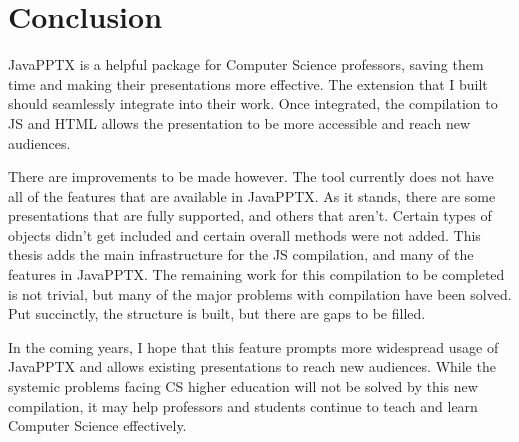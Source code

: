 \documentclass[12pt,twoside]{reedthesis}
\begin{document}
	
\chapter*{Conclusion}
	\setcounter{chapter}{4}
	\setcounter{section}{0}
	JavaPPTX is a helpful package for Computer Science professors, saving them time and making their presentations more effective. The extension that I built should seamlessly integrate into their work. Once integrated, the compilation to JS and HTML allows the presentation to be more accessible and reach new audiences. 
	
There are improvements to be made however. The tool currently does not have all of the features that are available in JavaPPTX. As it stands, there are some presentations that are fully supported, and others that aren't. Certain types of objects didn't get included and certain overall methods were not added. This thesis adds the main infrastructure for the JS compilation, and many of the features in JavaPPTX. The remaining work for this compilation to be completed is not trivial, but many of the major problems with compilation have been solved. Put succinctly, the structure is built, but there are gaps to be filled.

In the coming years, I hope that this feature prompts more widespread usage of JavaPPTX and allows existing presentations to reach new audiences. While the systemic problems facing CS higher education will not be solved by this new compilation, it may help professors and students continue to teach and learn Computer Science effectively. 
    \appendix



  \backmatter %

    \nocite{*}


%  
 

\end{document}
